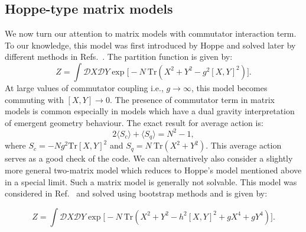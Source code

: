 \documentclass[letter,11pt]{article}
\begin{document}
\subsection{\label{subsec:Hoppe}Hoppe-type matrix models}
We now turn our attention to matrix models with commutator interaction term. 
To our knowledge, this model 
was first introduced by Hoppe \cite{Hoppe:1982en} and solved later by different methods in 
Refs.~\cite{Kazakov:1998ji,Berenstein:2008eg}.
The partition function is given by:
\begin{equation}
Z = \int \mathcal{D}X \mathcal{D}Y \exp \Big[-N ~ \mbox{Tr} (X^2 + Y^2 - g^2 [X,Y]^2) \Big]. 
\end{equation}
At large values of commutator coupling i.e., $ g \to \infty$, this model becomes commuting with 
$ [X,Y] \to 0$. The presence of commutator term in matrix models is common especially in 
models which have a dual gravity interpretation of emergent geometry behaviour. 
The exact result for average action is:
\begin{equation}
	2 \langle S_{c} \rangle + \langle S_{q}  \rangle = N^2 - 1, 
\end{equation}
where $ S_{c} = -Ng^2 \mbox{Tr}[X,Y]^2$  and 
$ S_{q} = N~\mbox{Tr} (X^2 + Y^2)$.
This average action serves as a good check of the code. We can alternatively also consider a slightly more general two-matrix model which reduces to Hoppe's model mentioned above in a special limit. 
Such a matrix model is generally not solvable. This model was considered in Ref.~\cite{Kazakov:2021lel} and 
solved using bootstrap methods and is given by:

\begin{equation}
\label{eq:GHM1} 
Z = \int \mathcal{D}X \mathcal{D}Y \exp \Big[-N ~ \mbox{Tr} (X^2 + Y^2 - h^2 [X,Y]^2 + gX^4 + gY^4) \Big].	
\end{equation}
\end{document}

